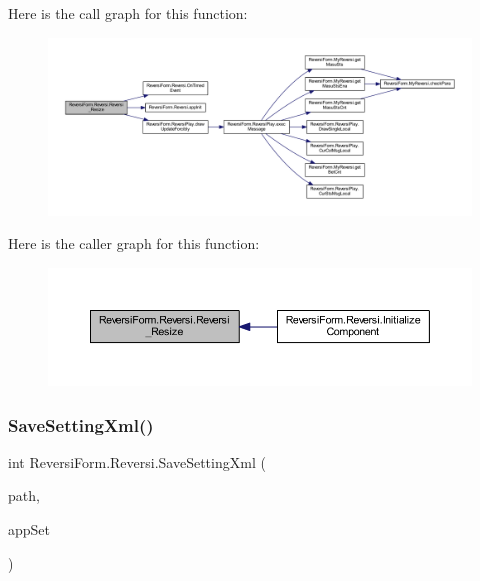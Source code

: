 Here is the call graph for this function\+:\nopagebreak
\begin{figure}[H]
\begin{center}
\leavevmode
\includegraphics[width=350pt]{class_reversi_form_1_1_reversi_ac4868f12e6f15387f8f39f5f1934e610_cgraph}
\end{center}
\end{figure}
Here is the caller graph for this function\+:\nopagebreak
\begin{figure}[H]
\begin{center}
\leavevmode
\includegraphics[width=350pt]{class_reversi_form_1_1_reversi_ac4868f12e6f15387f8f39f5f1934e610_icgraph}
\end{center}
\end{figure}
\mbox{\label{class_reversi_form_1_1_reversi_ac2c2df740914f062761a66f0bbde3f41}} 
\subsubsection{\texorpdfstring{Save\+Setting\+Xml()}{SaveSettingXml()}}
{\footnotesize\ttfamily int Reversi\+Form.\+Reversi.\+Save\+Setting\+Xml (\begin{DoxyParamCaption}\item[{string}]{path,  }\item[{ref \hyperlink{class_reversi_form_1_1_reversi_setting}{Reversi\+Setting}}]{app\+Set }\end{DoxyParamCaption})}



